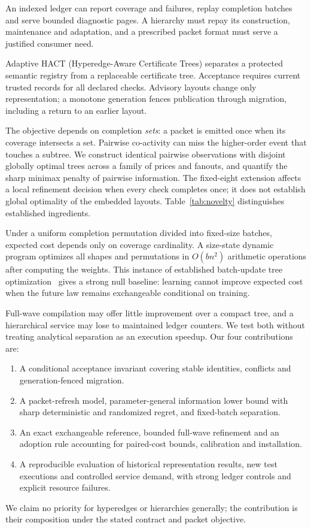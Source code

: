\documentclass[10pt,journal,compsoc]{IEEEtran}
\theoremstyle{definition}\newtheorem{definition}[theorem]{Definition}
\begin{document}
An indexed ledger can report coverage and failures, replay completion batches
and serve bounded diagnostic pages. A hierarchy must repay its construction,
maintenance and adaptation, and a prescribed packet format must serve a
justified consumer need.

Adaptive HACT (Hyperedge-Aware Certificate Trees) separates a protected semantic
registry from a replaceable certificate tree. Acceptance requires current
trusted records for all declared checks. Advisory layouts change only
representation; a monotone generation fences publication through migration,
including a return to an earlier layout.

The objective depends on completion \emph{sets}: a packet is emitted once
when its coverage intersects a set. Pairwise co-activity can miss the
higher-order event that touches a subtree. We construct identical pairwise
observations with disjoint globally optimal trees across a family of prices
and fanouts, and quantify the sharp minimax penalty of pairwise information.
The fixed-eight extension affects a local refinement decision when every
check completes once; it does not establish global optimality of the embedded
layouts. Table~\ref{tab:novelty} distinguishes established ingredients.

Under a uniform completion permutation divided into fixed-size batches,
expected cost depends only on coverage cardinality. A size-state dynamic
program optimizes all shapes and permutations in $O(bn^2)$ arithmetic
operations after computing the weights. This instance of established
batch-update tree optimization~\cite{graham2007} gives a strong null baseline:
learning cannot improve expected cost when the future law remains exchangeable
conditional on training.

Full-wave compilation may offer little improvement over a compact tree, and
a hierarchical service may lose to maintained ledger counters. We test both
without treating analytical separation as an execution speedup. Our four
contributions are:
\begin{enumerate}
\item A conditional acceptance invariant covering stable identities,
conflicts and generation-fenced migration.
\item A packet-refresh model, parameter-general information lower bound
with sharp deterministic and randomized regret, and fixed-batch separation.
\item An exact exchangeable reference, bounded full-wave refinement and an
adoption rule accounting for paired-cost bounds, calibration and installation.
\item A reproducible evaluation of historical representation results, new
test executions and controlled service demand, with strong ledger controls
and explicit resource failures.
\end{enumerate}
We claim no priority for hyperedges or hierarchies generally; the contribution
is their composition under the stated contract and packet objective.
\end{document}
